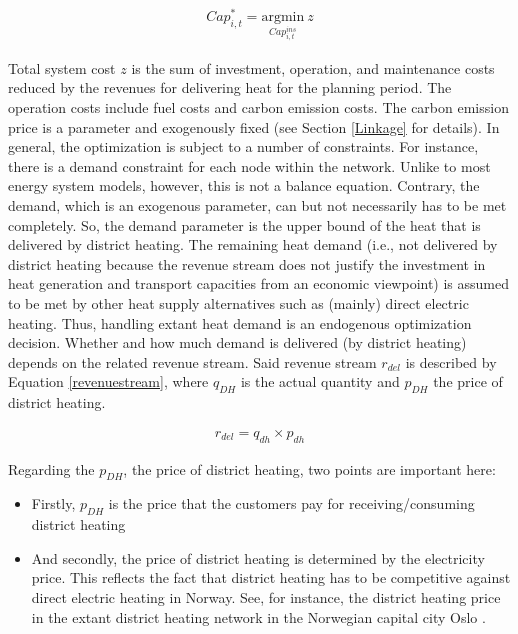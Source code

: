 \begin{align}\label{objective}
	Cap^{*}_{i, t} = \underset{Cap^{ins}_{i, t}}{\mathrm{argmin}}~z
\end{align}

Total system cost $z$ is the sum of investment, operation, and maintenance costs reduced by the revenues for delivering heat for the planning period. The operation costs include fuel costs and carbon emission costs. The carbon emission price is a parameter and exogenously fixed (see Section \ref{Linkage} for details). In general, the optimization is subject to a number of constraints. For instance, there is a demand constraint for each node within the network. Unlike to most energy system models, however, this is not a balance equation. Contrary, the demand, which is an exogenous parameter, can but not necessarily has to be met completely. So, the demand parameter is the upper bound of the heat that is delivered by district heating. The remaining heat demand (i.e., not delivered by district heating because the revenue stream does not justify the investment in heat generation and transport capacities from an economic viewpoint) is assumed to be met by other heat supply alternatives such as (mainly) direct electric heating. Thus, handling extant heat demand is an endogenous optimization decision. Whether and how much demand is delivered (by district heating) depends on the related revenue stream. Said revenue stream $r_{del}$ is described by Equation \ref{revenuestream}, where $q_{DH}$ is the actual quantity and $p_{DH}$ the price of district heating. 

\begin{align}\label{revenuestream}
	r_{del} = q_{dh} \times p_{dh} 
\end{align}

Regarding the $p_{DH}$, the price of district heating, two points are important here:

\begin{itemize}
	\item Firstly, $p_{DH}$ is the price that the customers pay for receiving/consuming district heating
	\item And secondly, the price of district heating is determined by the electricity price. This reflects the fact that district heating has to be competitive against direct electric heating in Norway. See, for instance, the district heating price in the extant district heating network in the Norwegian capital city Oslo \cite{sintef2015}. 
\end{itemize}

